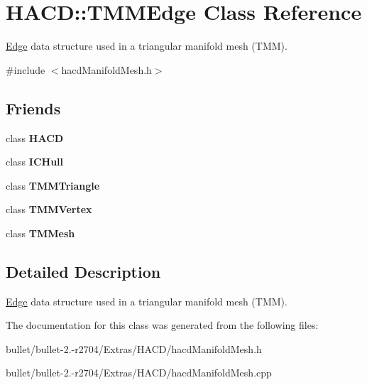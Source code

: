\hypertarget{class_h_a_c_d_1_1_t_m_m_edge}{\section{H\+A\+C\+D\+:\+:T\+M\+M\+Edge Class Reference}
\label{class_h_a_c_d_1_1_t_m_m_edge}
}


\hyperlink{struct_edge}{Edge} data structure used in a triangular manifold mesh (T\+M\+M).  




{\ttfamily \#include $<$hacd\+Manifold\+Mesh.\+h$>$}

\subsection*{Friends}
\begin{DoxyCompactItemize}
\item 
\hypertarget{class_h_a_c_d_1_1_t_m_m_edge_ab3497bc7797561d0c79ecef2f462e43a}{class {\bfseries H\+A\+C\+D}}\label{class_h_a_c_d_1_1_t_m_m_edge_ab3497bc7797561d0c79ecef2f462e43a}

\item 
\hypertarget{class_h_a_c_d_1_1_t_m_m_edge_af8c54a3b946020c72439a823fc62e570}{class {\bfseries I\+C\+Hull}}\label{class_h_a_c_d_1_1_t_m_m_edge_af8c54a3b946020c72439a823fc62e570}

\item 
\hypertarget{class_h_a_c_d_1_1_t_m_m_edge_ac66cabe598df0738b39a09449de0faad}{class {\bfseries T\+M\+M\+Triangle}}\label{class_h_a_c_d_1_1_t_m_m_edge_ac66cabe598df0738b39a09449de0faad}

\item 
\hypertarget{class_h_a_c_d_1_1_t_m_m_edge_a659602e9e98a787cbc2a635bd5277451}{class {\bfseries T\+M\+M\+Vertex}}\label{class_h_a_c_d_1_1_t_m_m_edge_a659602e9e98a787cbc2a635bd5277451}

\item 
\hypertarget{class_h_a_c_d_1_1_t_m_m_edge_a444d6b56620e89d598962bee57ddd380}{class {\bfseries T\+M\+Mesh}}\label{class_h_a_c_d_1_1_t_m_m_edge_a444d6b56620e89d598962bee57ddd380}

\end{DoxyCompactItemize}


\subsection{Detailed Description}
\hyperlink{struct_edge}{Edge} data structure used in a triangular manifold mesh (T\+M\+M). 

The documentation for this class was generated from the following files\+:\begin{DoxyCompactItemize}
\item 
bullet/bullet-\/2.-\/r2704/\+Extras/\+H\+A\+C\+D/hacd\+Manifold\+Mesh.\+h\item 
bullet/bullet-\/2.-\/r2704/\+Extras/\+H\+A\+C\+D/hacd\+Manifold\+Mesh.\+cpp\end{DoxyCompactItemize}
